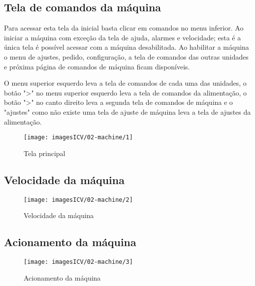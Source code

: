 \usepackage{graphicx}
\thispagestyle{fancy}
\vspace*{\fill}
\subsection{Tela de comandos da máquina}
Para acessar esta tela da inicial basta clicar em comandos no menu inferior. Ao iniciar a máquina com exceção da tela de ajuda, alarmes e velocidade; esta é a única tela é possível acessar com a máquina desabilitada. Ao habilitar a máquina o menu de ajustes, pedido, configuração, a tela de comandos das outras unidades e próxima página de comandos de máquina ficam disponíveis.

O menu superior esquerdo leva a tela de comandos de cada uma das unidades, o botão "\textgreater" no menu superior esquerdo leva a tela de comandos da alimentação, o botão "\textgreater" no canto direito leva a segunda tela de comandos de máquina e o "ajustes" como não existe uma tela de ajuste de máquina leva a tela de ajustes da alimentação.
\vspace*{10pt}

\begin{figure}
    \centering
    \texttt{[image: imagesICV/02-machine/1]}
    \caption{Tela principal}
    \label{fig:}
\end{figure}
\newpage
\thispagestyle{fancy}
\vspace{\fill}

\subsection{Velocidade da máquina}
\begin{figure}
    \centering
    \texttt{[image: imagesICV/02-machine/2]}
    \caption{Velocidade da máquina}
    \label{fig:}
\end{figure}
\newpage
\thispagestyle{fancy}
\vspace{\fill}

\subsection{Acionamento da máquina}
\begin{figure}
    \centering
    \texttt{[image: imagesICV/02-machine/3]}
    \caption{Acionamento da máquina}
    \label{fig:}
\end{figure}
\newpage
\thispagestyle{fancy}
\vspace{\fill}

